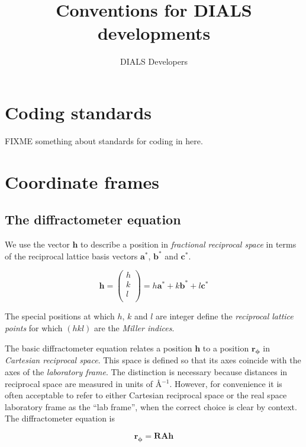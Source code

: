 \documentclass[a4paper, 11pt]{article}
\title{Conventions for DIALS developments}
\author{DIALS Developers}
\renewcommand{\vec}[1]{\mathbf{#1}}
\begin{document}
\maketitle
\section{Coding standards}

FIXME something about standards for coding in here.

\section{Coordinate frames}

\subsection{The diffractometer equation}

We use the vector $\vec{h}$ to describe a position in \emph{fractional reciprocal space}
in terms of the reciprocal lattice basis vectors $\vec{a^*}$, $\vec{b^*}$ and
$\vec{c^*}$.

\begin{equation}
\label{eq:miller_index}
\vec{h} = \begin{pmatrix}
h \\
k \\
l \\
\end{pmatrix} = h \vec{a^*} + k \vec{b^*} + l \vec{c^*}
\end{equation}

The special positions at which $h$, $k$ and $l$ are integer define the 
\emph{reciprocal lattice points} for which $(hkl)$ are the \emph{Miller
indices}.

The basic diffractometer equation relates a position $\vec{h}$ to a position
$\vec{r_\phi}$ in \emph{Cartesian reciprocal space}. This space is defined so
that its axes coincide with the axes of the \emph{laboratory frame}. The
distinction is necessary because distances in reciprocal space are measured in
units of {\AA}$^{-1}$. However, for convenience it is often acceptable to refer
to either Cartesian reciprocal space or the real space laboratory frame as the
``lab frame'', when the correct choice is clear by context. The diffractometer
equation is

\begin{equation}
\label{eq:diffractometer}
\vec{r_\phi} = \mathbf{R} \mathbf{A} \vec{h}
\end{equation}
\end{document}
